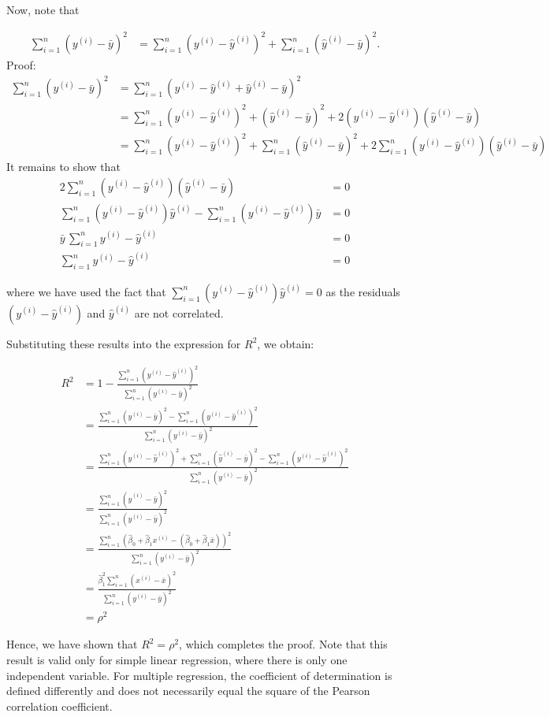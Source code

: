 {Now, note that

\begin{align*}
	\sum_{i=1}^n (y^{(i)}-\bar{y})^2 &= \sum_{i=1}^n (y^{(i)}-\hat{y}^{(i)})^2 + \sum_{i=1}^n (\hat{y}^{(i)} - \bar{y})^2.
\end{align*}
Proof: 
\begin{align*}
	\sum_{i=1}^n (y^{(i)}-\bar{y})^2 
	&= \sum_{i=1}^n (y^{(i)} - \hat{y}^{(i)} + \hat{y}^{(i)} - \bar{y})^2 \\
	&= \sum_{i=1}^n (y^{(i)} - \hat{y}^{(i)})^2 + (\hat{y}^{(i)} - \bar{y})^2 + 2(y^{(i)}-\hat{y}^{(i)})(\hat{y}^{(i)} - \bar{y}) \\
	&= \sum_{i=1}^n (y^{(i)} - \hat{y}^{(i)})^2 + \sum_{i=1}^n(\hat{y}^{(i)} - \bar{y})^2 + 2\sum_{i=1}^n(y^{(i)}-\hat{y}^{(i)})(\hat{y}^{(i)} - \bar{y})
\end{align*}
It remains to show that 
\begin{align*}
	2\sum_{i=1}^n(y^{(i)}-\hat{y}^{(i)})(\hat{y}^{(i)} - \bar{y}) &= 0 \\
	\sum_{i=1}^n (y^{(i)}-\hat{y}^{(i)})\hat{y}^{(i)} - \sum_{i=1}^n (y^{(i)}-\hat{y}^{(i)})\bar{y}&= 0 \\
	\bar{y}\, \sum_{i=1}^n y^{(i)}-\hat{y}^{(i)} &= 0 \\
	\sum_{i=1}^n y^{(i)}-\hat{y}^{(i)} &= 0
\end{align*}

where we have used the fact that $\sum_{i=1}^n (y^{(i)}-\hat{y}^{(i)})\hat{y}^{(i)} = 0$ as the residuals $(y^{(i)}-\hat{y}^{(i)})$ and $\hat{y}^{(i)}$ are not correlated.

Substituting these results into the expression for $R^2$, we obtain:

\begin{align*}
	R^2 &= 1 - \frac{\sum_{i=1}^n (y^{(i)} - \hat{y}^{(i)})^2}{\sum_{i=1}^n (y^{(i)} - \bar{y})^2} \\
	&= \frac{\sum_{i=1}^n (y^{(i)} - \bar{y})^2 - \sum_{i=1}^n (y^{(i)} - \hat{y}^{(i)})^2}{\sum_{i=1}^n (y^{(i)} - \bar{y})^2}\\
	&= \frac{\sum_{i=1}^n (y^{(i)}-\hat{y}^{(i)})^2 + \sum_{i=1}^n (\hat{y}^{(i)} - \bar{y})^2 - \sum_{i=1}^n (y^{(i)} - \hat{y}^{(i)})^2}{\sum_{i=1}^n (y^{(i)} - \bar{y})^2}\\
	&= \frac{\sum_{i=1}^n (\hat{y}^{(i)} - \bar{y})^2}{\sum_{i=1}^n (y^{(i)} - \bar{y})^2}\\
	&= \frac{\sum_{i=1}^n(\hat{\beta}_0 + \hat{\beta}_1 x^{(i)}- (\hat{\beta}_0 + \hat{\beta}_1 \bar{x}))^2}{\sum_{i=1}^n (y^{(i)} - \bar{y})^2} \\
	&= \frac{\hat{\beta}_1^2 \sum_{i=1}^n (x^{(i)} - \bar{x})^2}{\sum_{i=1}^n (y^{(i)} - \bar{y})^2} \\
	&= \rho^2
\end{align*}

Hence, we have shown that $R^2 = \rho^2$, which completes the proof. Note that this result is valid only for simple linear regression, where there is only one independent variable. For multiple regression, the coefficient of determination is defined differently and does not necessarily equal the square of the Pearson correlation coefficient.

}

